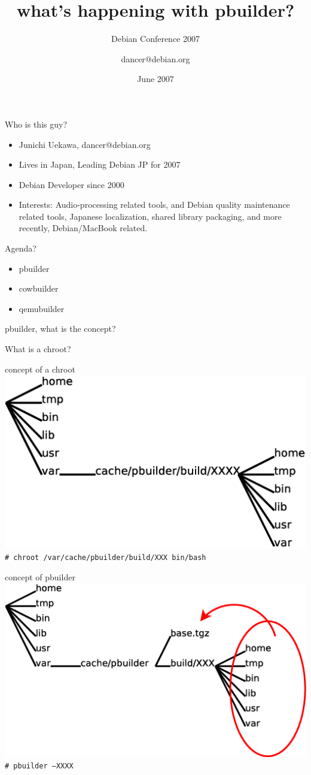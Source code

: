 \documentclass[dvipdfm,17pt,times]{beamer}
\title{what's happening with pbuilder?}
\subtitle{Debian Conference 2007}
\author{dancer@debian.org}
\date{June 2007}
\newcommand{\emtext}[1]{
\begin{frame}{}
 
{\Huge #1
}
\end{frame}
}
\begin{document}
\frame{\titlepage{}}

\begin{frame}{Who is this guy?}
\begin{itemize}
 \item Junichi Uekawa, dancer@debian.org
 \item Lives in Japan, Leading Debian JP for 2007
 \item Debian Developer since 2000
 \item Interests: Audio-processing related tools, and 
       Debian quality maintenance related tools,
       Japanese localization, shared library packaging, 
       and more recently, Debian/MacBook related.
\end{itemize}
\end{frame}

\begin{frame}{Agenda?}
\begin{itemize}
 \item pbuilder
 \item cowbuilder
 \item qemubuilder
\end{itemize}
\end{frame}

\emtext{pbuilder, what is the concept?}

\emtext{What is a chroot?}

\begin{frame}{concept of a chroot}
 \includegraphics[width=0.8\hsize]{chroot.eps}\\
\texttt{\# chroot /var/cache/pbuilder/build/XXX bin/bash}
\end{frame}

\begin{frame}{concept of pbuilder}
 \includegraphics[width=1\hsize]{chroot-pbuilder.eps}\\
\texttt{\# pbuilder --XXXX}
\end{frame}
\end{document}
